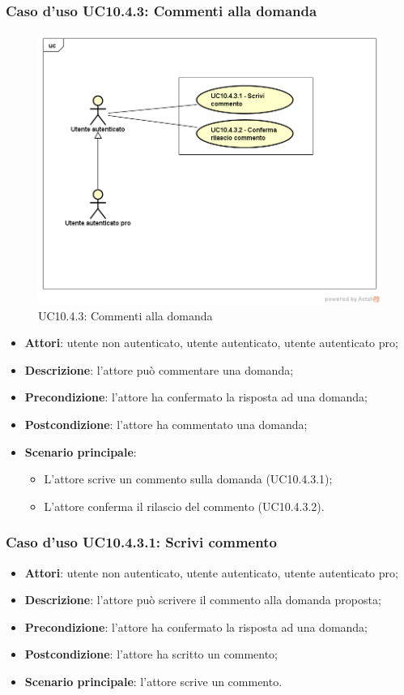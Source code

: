\subsubsection{Caso d'uso UC10.4.3: Commenti alla domanda}
\label{UC10.4.3}
\begin{figure}
	\centering
	\includegraphics[scale=0.5]{UML/UC10_4_3.png}
	\caption{UC10.4.3: Commenti alla domanda}
\end{figure}
	\begin{itemize}
		\item \textbf{Attori}: utente non autenticato, utente autenticato, utente autenticato pro;
		\item \textbf{Descrizione}: l'attore può commentare una domanda;
		\item \textbf{Precondizione}: l'attore ha confermato la risposta ad una domanda;
		\item \textbf{Postcondizione}: l'attore ha commentato una domanda;
		\item \textbf{Scenario principale}:
			\begin{itemize}
				\item L'attore scrive un commento sulla domanda (UC10.4.3.1);
				\item L'attore conferma il rilascio del commento (UC10.4.3.2).
			\end{itemize}
	\end{itemize}
\subsubsection{Caso d'uso UC10.4.3.1: Scrivi commento}
	\begin{itemize}
		\item \textbf{Attori}: utente non autenticato, utente autenticato, utente autenticato pro;
		\item \textbf{Descrizione}: l'attore può scrivere il commento alla domanda proposta;
		\item \textbf{Precondizione}: l'attore ha confermato la risposta ad una domanda;
		\item \textbf{Postcondizione}: l'attore ha scritto un commento;
		\item \textbf{Scenario principale}: l'attore scrive un commento.
	\end{itemize}
